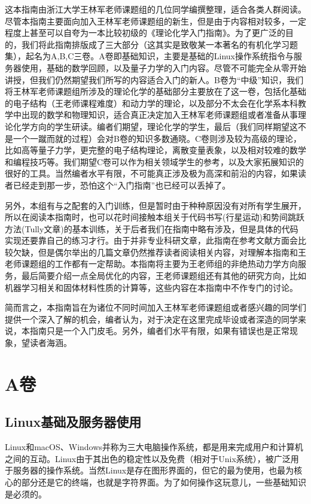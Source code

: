 \documentclass[12pt,a4paper,openany,twoside]{book}
\numberwithin{equation}{section}
\begin{document}
      这本指南由浙江大学王林军老师课题组的几位同学编撰整理，适合各类人群阅读。尽管本指南主要面向加入王林军老师课题组的新生，但是由于内容相对较多，一定程度上甚至可以自夸为一本比较初级的《理论化学入门指南》。为了更广泛的目的，我们将此指南排版成了三大部分（这其实是致敬某一本著名的有机化学习题集），起名为A,B,C三卷。A卷即基础知识，主要是基础的Linux操作系统指令与服务器使用，基础的数学回顾，以及量子力学的入门内容。尽管不可能完全从零开始讲授，但我们仍然期望我们所写的内容适合入门的新人。B卷为“中级”知识，我们将王林军老师课题组所涉及的理论化学的基础部分主要放在了这一卷，包括化基础的电子结构（王老师课程难度）和动力学的理论，以及部分不太会在化学系本科教学中出现的数学和物理知识，适合真正决定加入王林军老师课题组或者准备从事理论化学方向的学生研读。编者们期望，理论化学的学生，最后（我们同样期望这不是一个一蹴而就的过程）会对B卷的知识多数通晓。C卷则涉及较为高级的理论，比如高等量子力学，更完整的电子结构理论，离散变量表象，以及相对较难的数学和编程技巧等。我们期望C卷可以作为相关领域学生的参考，以及大家拓展知识的很好的工具。当然编者水平有限，不可能真正涉及极为高深和前沿的内容，如果读者已经走到那一步，恐怕这个“入门指南”也已经可以丢掉了。

      另外，本组有与之配套的入门训练，但是暂时由于种种原因没有对所有学生展开，所以在阅读本指南时，也可以花时间接触本组关于代码书写(行星运动)和势间跳跃方法(Tully文章)的基本训练，关于后者我们在指南中略有涉及，但是具体的代码实现还要靠自己的练习才行。由于并非专业科研文章，此指南在参考文献方面会比较欠缺，但是偶尔举出的几篇文章仍然推荐读者阅读相关内容，对理解本指南和王老师课题组的工作都有一定帮助。本指南将主要为王老师组的非绝热动力学方向服务，最后简要介绍一点全局优化的内容，王老师课题组还有其他的研究方向，比如机器学习相关和固体材料性质的计算等，这些内容在本指南中不作专门的讨论。
      
      简而言之，本指南旨在为诸位不同时间加入王林军老师课题组或者感兴趣的同学们提供一个深入了解的机会，编者认为，对于决定在这里完成毕设或者深造的同学来说，本指南只是一个入门皮毛。另外，编者们水平有限，如果有错误也是正常现象，望读者海涵。

    \part{A卷}
    \chapter{Linux基础及服务器使用}
      Linux和macOS、Windows并称为三大电脑操作系统，都是用来完成用户和计算机之间的互动。Linux由于其出色的稳定性以及免费（相对于Unix系统），被广泛用于服务器的操作系统。当然Linux是存在图形界面的，但它的最为使用，也最为核心的部分还是它的终端，也就是字符界面。为了如何操作这玩意儿，一些基础知识是必须的。
\end{document}
